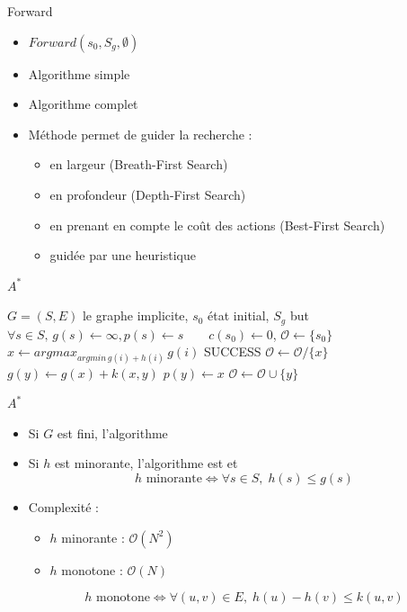 \documentclass[compress]{beamer}
\begin{document}
\begin{frame}{Forward}
\begin{itemize}
\item $Forward(s_0, S_g, \emptyset)$
\item Algorithme simple
\item Algorithme complet
\item Méthode  permet de guider la recherche :
	\begin{itemize}
	\item en largeur (Breath-First Search)
	\item en profondeur (Depth-First Search)
	\item en prenant en compte le coût des actions (Best-First Search)
	\item guidée par une heuristique
	\end{itemize}
\end{itemize}
\end{frame}

\begin{frame}{$A^*$}
\begin{algorithmic}\small
\REQUIRE $G=(S,E)$ le graphe implicite, $s_0$ état initial, $S_g$ but
\STATE $\forall s \in S, \, g(s) \leftarrow \infty, p(s) \leftarrow s \qquad
	c(s_0) \leftarrow 0$, $\mathcal{O} \leftarrow \{s_0\}$
	\STATE $x \leftarrow argmax_{argmin \, g(i) + h(i)} \, g(i)$
    	\RETURN SUCCESS
    \ENDIF
	\STATE $\mathcal{O} \leftarrow \mathcal{O} / \{x\}$
			\STATE $g(y) \leftarrow g(x) + k(x,y)$
			\STATE $p(y) \leftarrow x$
			\STATE $\mathcal{O} \leftarrow \mathcal{O} \cup \{y\}$
		\ENDIF
	\ENDFOR
\ENDWHILE
\end{algorithmic}
\end{frame}

\begin{frame}{$A^*$}
\begin{itemize}
\item Si $G$ est fini, l'algorithme 
\item Si $h$ est minorante, l'algorithme est  et 
$$h \mbox{ minorante} \Leftrightarrow \forall s \in S, \; h(s) \leq g(s)$$
\item Complexité :
	\begin{itemize}
	\item $h$ minorante : $\mathcal{O}(N^2)$
	\item $h$ monotone : $\mathcal{O}(N)$
	\end{itemize}
$$h \mbox{ monotone} \Leftrightarrow \forall (u, v) \in E, \; h(u) - h(v) \leq k(u,v)$$
\end{itemize}
\end{frame}
\end{document}
